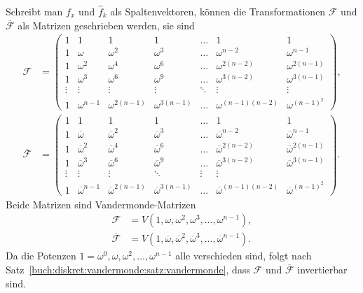 Schreibt man $f_x$ und $\hat{f}_k$ als Spaltenvektoren, können die
Transformationen $\mathscr{F}$ und $\overline{\mathscr{F}}$ als
Matrizen geschrieben werden, sie sind
\bgroup
\def\v{\vdots}
\def\o{\overline{\omega}}
\renewcommand\arraystretch{1.15}
\begin{align*}
\mathscr{F}
&=
\begin{pmatrix}
 1&     1      &       1&       1&\dots &           1   &           1   \\
 1&\omega      &\omega^2&\omega^3&\dots &\omega^{n-2}   &\omega^{n-1}   \\
 1&\omega^2    &\omega^4&\omega^6&\dots &\omega^{2(n-2)}&\omega^{2(n-1)}\\
 1&\omega^3    &\omega^6&\omega^9&\dots &\omega^{3(n-2)}&\omega^{3(n-1)}\\[-2pt]
\v&\v&\v&\v&\ddots&\v&\v\\
 1&\omega^{n-1}&\omega^{2(n-1)}&\omega^{3(n-1)}&\dots &\omega^{(n-1)(n-2)}&\omega^{(n-1)^2}
\end{pmatrix},
\\
\overline{\mathscr{F}}
&=
\begin{pmatrix}
 1&     1  &       1   &   1       &\dots &           1   &       1   \\
 1&\o      &\o^2       &\o^3       &\dots &\o^{n-2}       &\o^{n-1}   \\
 1&\o^2    &\o^4       &\o^6       &\dots &\o^{2(n-2)}    &\o^{2(n-1)}\\
 1&\o^3    &\o^6       &\o^9       &\dots &\o^{3(n-2)}    &\o^{3(n-1)}\\[-2pt]
\v&\v&\v&\ddots&\v&\v\\
 1&\o^{n-1}&\o^{2(n-1)}&\o^{3(n-1)}&\dots &\o^{(n-1)(n-2)}&\o^{(n-1)^2}
\end{pmatrix}.
\end{align*}
\egroup
Beide Matrizen sind Vandermonde-Matrizen
\begin{align}
\mathscr{F}
&=
V(1,\omega,\omega^2,\omega^3,\dots,\omega^{n-1}),
\label{buch:diskret:vandermonde:eqn:vanderfourier}
\\
\overline{\mathscr{F}}
&=
V(1,\overline{\omega},\overline{\omega}^2,\overline{\omega}^3,\dots,\overline{\omega}^{n-1}).
\label{buch:diskret:vandermonde:eqn:vanderifourier}
\end{align}
Da die Potenzen $1=\omega^0,\omega,\omega^2,\dots,\omega^{n-1}$ alle
verschieden sind, folgt nach
Satz~\ref{buch:diskret:vandermonde:satz:vandermonde},
dass $\mathscr{F}$ und $\overline{\mathscr{F}}$ invertierbar sind.

